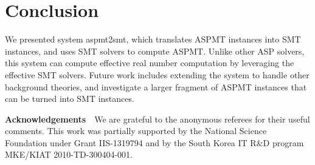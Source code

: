 \documentclass[runningheads]{llncs}
\begin{document}


\section{Conclusion}

We presented system {\sc aspmt2smt}, which translates ASPMT instances
into SMT instances, and uses SMT solvers to compute ASPMT. 
Unlike other ASP solvers, this system can compute effective real
number computation by leveraging the effective SMT solvers. 
Future work includes extending the system to handle other background
theories, and investigate a larger fragment of ASPMT instances that
can be turned into SMT instances. 

\smallskip\noindent
{\bf Acknowledgements}\ \ 
We are grateful to the anonymous referees for their useful comments. 
This work was partially supported by the National Science Foundation under Grant IIS-1319794 and by the South Korea IT R\&D program MKE/KIAT
2010-TD-300404-001.





%
\end{document}
